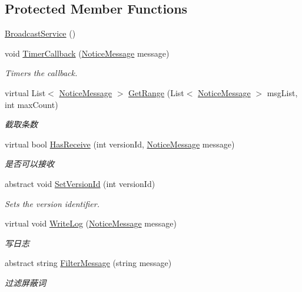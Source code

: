 \subsection*{Protected Member Functions}
\begin{DoxyCompactItemize}
\item 
\mbox{\hyperlink{class_t_net_1_1_message_1_1_broadcast_service_af3378690a5b7dc64ad09e983c5b72b40}{Broadcast\+Service}} ()
\item 
void \mbox{\hyperlink{class_t_net_1_1_message_1_1_broadcast_service_a9e08a12f289f26b74c099b1bbe5e2fef}{Timer\+Callback}} (\mbox{\hyperlink{class_t_net_1_1_message_1_1_notice_message}{Notice\+Message}} message)
\begin{DoxyCompactList}\small\item\em Timers the callback. \end{DoxyCompactList}\item 
virtual List$<$ \mbox{\hyperlink{class_t_net_1_1_message_1_1_notice_message}{Notice\+Message}} $>$ \mbox{\hyperlink{class_t_net_1_1_message_1_1_broadcast_service_add615e0b3e5565dacee3460a14a7a0b2}{Get\+Range}} (List$<$ \mbox{\hyperlink{class_t_net_1_1_message_1_1_notice_message}{Notice\+Message}} $>$ msg\+List, int max\+Count)
\begin{DoxyCompactList}\small\item\em 截取条数 \end{DoxyCompactList}\item 
virtual bool \mbox{\hyperlink{class_t_net_1_1_message_1_1_broadcast_service_a1b6f22fe5ff9d2f4c52aa9a288f3e5f5}{Has\+Receive}} (int version\+Id, \mbox{\hyperlink{class_t_net_1_1_message_1_1_notice_message}{Notice\+Message}} message)
\begin{DoxyCompactList}\small\item\em 是否可以接收 \end{DoxyCompactList}\item 
abstract void \mbox{\hyperlink{class_t_net_1_1_message_1_1_broadcast_service_a1fd74813f1821180ecd9bc9fd52667f7}{Set\+Version\+Id}} (int version\+Id)
\begin{DoxyCompactList}\small\item\em Sets the version identifier. \end{DoxyCompactList}\item 
virtual void \mbox{\hyperlink{class_t_net_1_1_message_1_1_broadcast_service_abb5f6c7e9682d075d5aebfe2fffaa5b7}{Write\+Log}} (\mbox{\hyperlink{class_t_net_1_1_message_1_1_notice_message}{Notice\+Message}} message)
\begin{DoxyCompactList}\small\item\em 写日志 \end{DoxyCompactList}\item 
abstract string \mbox{\hyperlink{class_t_net_1_1_message_1_1_broadcast_service_af6fd9b9301071729c799c11caa7601e9}{Filter\+Message}} (string message)
\begin{DoxyCompactList}\small\item\em 过滤屏蔽词 \end{DoxyCompactList}\end{DoxyCompactItemize}


